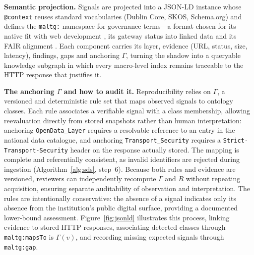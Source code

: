 \documentclass[engproc,proceedingpaper,submit,moreauthors]{Definitions/mdpi}
\begin{document}
    \textbf{Semantic projection.}
    Signals are projected into a JSON-LD instance whose \texttt{@context} reuses standard vocabularies (Dublin Core, SKOS, Schema.org) and defines the \texttt{maltg:} namespace for governance terms---a format chosen for its native fit with web development \cite{Guha2016}, its gateway status into linked data \cite{Bizer2009} and its FAIR alignment \cite{Wilkinson2016}. Each component carries its layer, evidence (URL, status, size, latency), findings, gaps and anchoring $\Gamma$, turning the shadow into a queryable knowledge subgraph \cite{Hogan2021} in which every macro-level index remains traceable to the HTTP response that justifies it.

    \textbf{The anchoring $\Gamma$ and how to audit it.}
    Reproducibility relies on $\Gamma$, a versioned and deterministic rule set that maps observed signals to ontology classes. Each rule associates a verifiable signal with a class membership, allowing reevaluation directly from stored snapshots rather than human interpretation: anchoring \texttt{OpenData\_Layer} requires a resolvable reference to an entry in the national data catalogue, and anchoring \texttt{Transport\_Security} requires a \texttt{Strict-Transport-Security} header on the response actually stored. The mapping is complete and referentially consistent, as invalid identifiers are rejected during ingestion (Algorithm~\ref{alg:sds}, step~6). Because both rules and evidence are versioned, reviewers can independently recompute $\Gamma$ and $R$ without repeating acquisition, ensuring separate auditability of observation and interpretation. The rules are intentionally conservative: the absence of a signal indicates only its absence from the institution's public digital surface, providing a documented lower-bound assessment. Figure~\ref{fig:jsonld} illustrates this process, linking evidence to stored HTTP responses, associating detected classes through \texttt{maltg:mapsTo} is $\Gamma(v)$, and recording missing expected signals through \texttt{maltg:gap}.
\end{document}
